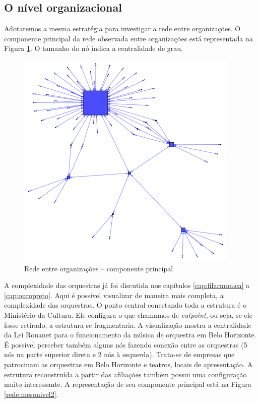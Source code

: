 \documentclass[a4paper, 12pt, openright, oneside, german, french, english, brazil]{abntex2}
\begin{document}
		
	\subsection{O nível organizacional}
	
	Adotaremos a mesma estratégia para investigar a rede entre organizações. O componente principal da rede observada entre organizações está representada na Figura \ref{rede:organizacoes}. O tamanho do nó indica a centralidade de grau.
	
	
	\begin{figure}[!ht]
		\centering
		\caption{Rede entre organizações -- componente principal}
		\label{rede:organizacoes}
		\includegraphics[scale=.7]{nivel2.png}
	\end{figure}
	
	A complexidade das orquestras já foi discutida nos capítulos \ref{cap:filarmonica} a \ref{cap:ouropreto}. Aqui é possível visualizar de maneira mais completa, a complexidade das orquestras. O ponto central conectando toda a estrutura é o Ministério da Cultura. Ele configura o que chamamos de \textit{cutpoint}, ou seja, se ele fosse retirado, a estrutura se fragmentaria. A visualização mostra a centralidade da Lei Rouanet para o funcionamento da música de orquestra em Belo Horizonte. É possível perceber também alguns nós fazendo conexão entre as orquestras (5 nós na parte superior direta e 2 nós à esquerda). Trata-se de empresas que patrocinam as orquestras em Belo Horizonte e teatros, locais de apresentação. A estrutura reconstruída a partir das afiliações também possui uma configuração muito interessante. A representação de seu componente principal está na Figura \ref{rede:mesonivel2}.
	
\end{document}
